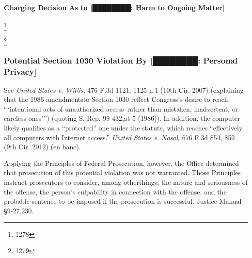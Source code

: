 

\paragraph{Charging Decision As to [████████: Harm to Ongoing Matter]}
\footnote{1278}




\footnote{1279}






\subsubsection{Potential Section 1030 Violation By [████████: Personal Privacy]}

See \textit{United States v. Willis}, 476 F.3d 1121, 1125 n.1 (10th Cir. 2007) (explaining that the 1986 amendmentsto Section 1030 reflect Congress's desire to reach ```intentional acts of unauthorized access--rather than mistaken, inadvertent, or careless ones''') (quoting S. Rep. 99-432,at 5 (1986)). 
In addition, the computer  likely qualifies as a ``protected'' one under the statute, which reaches ``effectively all computers with Internet access.'' 
\textit{United States v. Nosal}, 676 F.3d 854, 859 (9th Cir. 2012) (en banc).

Applying the Principles of Federal Prosecution, however, the Office determined that prosecution of this potential violation was not warranted. 
Those Principles instruct prosecutors to consider, among otherthings, the nature and seriousness of the offense, the person's culpability in connection with the offense, and the probable sentence to be imposed if the prosecution is successful. 
Justice Manual \S 9-27.230. 

